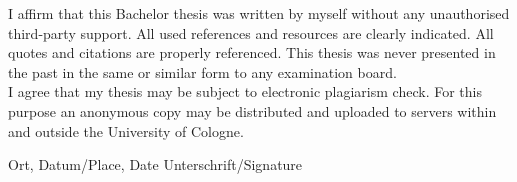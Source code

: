 \documentclass[a4paper,12pt]{scrartcl} %
\begin{document}
\vspace{1cm}

I affirm that this Bachelor thesis was written by myself without any unauthorised third-party
support. All used references and resources are clearly indicated. All quotes and citations are
properly referenced. This thesis was never presented in the past in the same or similar form to
any examination board.\\
I agree that my thesis may be subject to electronic plagiarism check. For this purpose an
anonymous copy may be distributed and uploaded to servers within and outside the University
of Cologne.

\vspace{3cm}
\makebox[\textwidth]{\hrulefill \hspace{3cm} \hrulefill}

Ort, Datum/Place, Date \hfill Unterschrift/Signature
\end{document}
